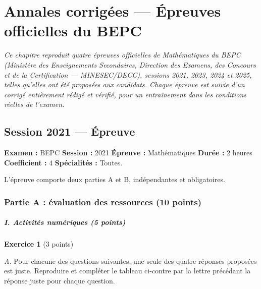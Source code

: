 \chapter{Annales corrigées — Épreuves officielles du BEPC}

\noindent\textit{Ce chapitre reproduit quatre épreuves officielles de Mathématiques du BEPC
(Ministère des Enseignements Secondaires, Direction des Examens, des Concours et de la
Certification — MINESEC/DECC), sessions 2021, 2023, 2024 et 2025, telles qu'elles ont été
proposées aux candidats. Chaque épreuve est suivie d'un corrigé entièrement rédigé et
vérifié, pour un entraînement dans les conditions réelles de l'examen.}
\vspace{8pt}

\connecteBanner

\section{Session 2021 — Épreuve}

\noindent\textbf{Examen :} BEPC \quad\textbf{Session :} 2021 \quad\textbf{Épreuve :}
Mathématiques \quad\textbf{Durée :} 2 heures \quad\textbf{Coefficient :} 4 \quad
\textbf{Spécialités :} Toutes.
\par\smallskip\noindent
L'épreuve comporte deux parties A et B, indépendantes et obligatoires.

\subsection*{Partie A : évaluation des ressources (10 points)}

\paragraph{I. Activités numériques (5 points)}

\textbf{Exercice 1} (3 points)

\emph{A.} Pour chacune des questions suivantes, une seule des quatre réponses proposées est
juste. Reproduire et compléter le tableau ci-contre par la lettre précédant la réponse juste
pour chaque question.

